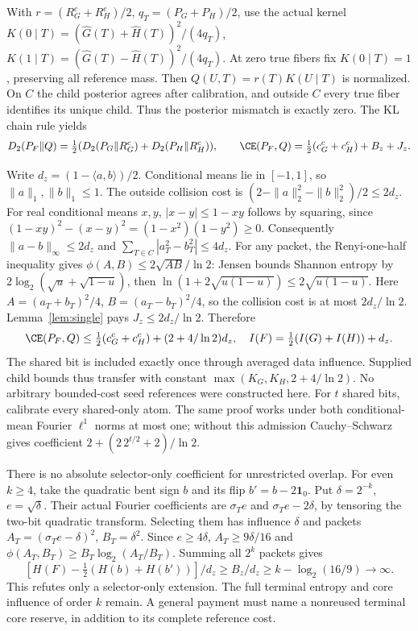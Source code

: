 With $r=(R_G^c+R_H^c)/2$, $q_T=(P_G+P_H)/2$, use the actual kernel
$K(0\mid T)=(\widehat G(T)+\widehat H(T))^2/(4q_T)$,
$K(1\mid T)=(\widehat G(T)-\widehat H(T))^2/(4q_T)$.
At zero true fibers fix $K(0\mid T)=1$, preserving all reference mass.
Then $Q(U,T)=r(T)K(U\mid T)$ is normalized. On $C$ the child posterior
agrees after calibration, and outside $C$ every true fiber identifies
its unique child. Thus the posterior mismatch is exactly zero.
The KL chain rule yields
\[
 D_2(P_F\Vert Q)=\tfrac12(D_2(P_G\Vert R_G^c)+D_2(P_H\Vert R_H^c)),
 \qquad \CE(P_F,Q)=\tfrac12(c_G^c+c_H^c)+B_z+J_z.
\]

Write $d_z=(1-\langle a,b\rangle)/2$. Conditional means lie in $[-1,1]$,
so $\|a\|_1,\|b\|_1\le1$. The outside collision cost is
$(2-\|a\|_2^2-\|b\|_2^2)/2\le2d_z$.
For real conditional means $x,y$, $|x-y|\le1-xy$ follows by squaring,
since $(1-xy)^2-(x-y)^2=(1-x^2)(1-y^2)\ge0$.
Consequently $\|a-b\|_\infty\le2d_z$ and
$\sum_{T\in C}|a_T^2-b_T^2|\le4d_z$.
For any packet, the Renyi-one-half inequality gives
$\phi(A,B)\le2\sqrt{AB}/\ln2$:
Jensen bounds Shannon entropy by $2\log_2(\sqrt u+\sqrt{1-u})$,
then $\ln(1+2\sqrt{u(1-u)})\le2\sqrt{u(1-u)}$.
Here $A=(a_T+b_T)^2/4$, $B=(a_T-b_T)^2/4$,
so the collision cost is at most $2d_z/\ln2$.
Lemma~\ref{lem:single} pays $J_z\le2d_z/\ln2$. Therefore
\[
 \CE(P_F,Q)\le\tfrac12(c_G^c+c_H^c)+(2+4/\ln2)d_z,\quad
 I(F)=\tfrac12(I(G)+I(H))+d_z.
\]
The shared bit is included exactly once through averaged data influence.
Supplied child bounds thus transfer with constant $\max(K_G,K_H,2+4/\ln2)$.
No arbitrary bounded-cost seed references were constructed here.
For $t$ shared bits, calibrate every shared-only atom. The same proof
works under both conditional-mean Fourier $\ell^1$ norms at most one;
without this admission Cauchy--Schwarz gives coefficient
$2+(2\,2^{t/2}+2)/\ln2$.

There is no absolute selector-only coefficient for unrestricted overlap.
For even $k\ge4$, take the quadratic bent sign $b$ and its flip
$b'=b-2\mathbf1_0$. Put $\delta=2^{-k}$, $e=\sqrt\delta$.
Their actual Fourier coefficients are $\sigma_Te$ and $\sigma_Te-2\delta$,
by tensoring the two-bit quadratic transform. Selecting them has influence
$\delta$ and packets $A_T=(\sigma_Te-\delta)^2$, $B_T=\delta^2$.
Since $e\ge4\delta$, $A_T\ge9\delta/16$ and
$\phi(A_T,B_T)\ge B_T\log_2(A_T/B_T)$.
Summing all $2^k$ packets gives
\[
 [H(F)-\tfrac12(H(b)+H(b'))]/d_z\ge B_z/d_z
 \ge k-\log_2(16/9)\longrightarrow\infty.
\]
This refutes only a selector-only extension. The full terminal entropy and
core influence of order $k$ remain. A general payment must name a
nonreused terminal core reserve, in addition to its complete reference cost.
